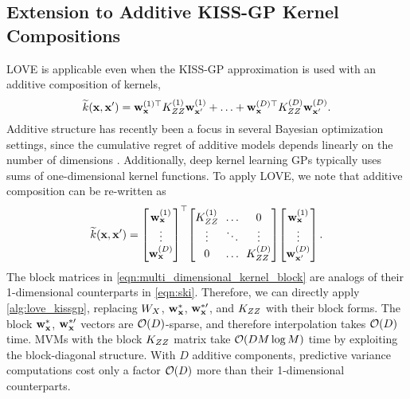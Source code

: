 \subsection{Extension to Additive KISS-GP Kernel Compositions}
LOVE{} is applicable even when the KISS-GP approximation is used with an additive composition of kernels,
%
\begin{equation}
  \widetilde{k}(\mathbf{x}, \mathbf{x}') =
  \mathbf{w}^{(1)\top}_{\mathbf{x}} K^{(1)}_{Z Z} \mathbf{w}^{(1)}_{\mathbf{x}'} + \ldots + \mathbf{w}^{(D)\top}_{\mathbf{x}} K^{(D)}_{Z Z} \mathbf{w}^{(D)}_{\mathbf{x}'}.
  \notag
\end{equation}
Additive structure has recently been a focus in several Bayesian optimization settings, since the cumulative regret of additive models depends linearly on the number of dimensions
\cite{kandasamy2015high,wang2017batched,gardner2017discovering,wang2017max}.
Additionally, deep kernel learning GPs \citep{wilson2016deep,wilson2016stochastic} typically uses sums of one-dimensional kernel functions.
To apply LOVE{}, we note that additive composition can be re-written as
%
\begin{equation}
  \widetilde{k}(\bx, \bx') =
  \begin{bmatrix}
    \bw^{(1)}_{\bx} \\
    \vdots \\
    \bw^{(D)}_{\bx}
  \end{bmatrix}^\top
  \!
  \begin{bmatrix}
    \bK^{(1)}_{\bZ \bZ} & \!\! \ldots \!\! & 0 \\
    \vdots & \!\! \ddots \!\! & \vdots \\
    0 & \!\! \ldots \!\! & \bK^{(D)}_{\bZ \bZ}
  \end{bmatrix}
  \!
  \begin{bmatrix}
    \bw^{(1)}_{\bx} \\
    \vdots \\
    \bw^{(D)}_{\bx'}
  \end{bmatrix}.
  \label{eqn:multi_dimensional_kernel_block}
\end{equation}
%
The block matrices in \cref{eqn:multi_dimensional_kernel_block} are analogs of their 1-dimensional counterparts in \cref{eqn:ski}.
Therefore, we can directly apply \cref{alg:love_kissgp}, replacing $W_{X}$, $\bw_\bxtest$, $\bw_\bxtestprime$, and $K_{ZZ}$ with their block forms.
The block $\bw_\bxtest$, $\bw_\bxtestprime$ vectors are $\bigo{D}$-sparse, and therefore interpolation takes $\bigo{D}$ time.
MVMs with the block $K_{ZZ}$ matrix take $\bigo{DM\log M}$ time by exploiting the block-diagonal structure.
With $D$ additive components, predictive variance computations cost only a factor $\bigo{D}$ more than their 1-dimensional counterparts.

